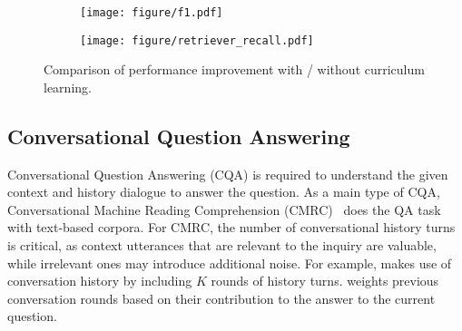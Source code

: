 \begin{figure}[t]
     \centering
     \begin{subfigure}[b]{0.23\textwidth}
         \centering
         \texttt{[image: figure/f1.pdf]}
         \caption{}
         \label{fig:curriculum_f1}
     \end{subfigure}
     \hfill
     \begin{subfigure}[b]{0.23\textwidth}
         \centering
         \texttt{[image: figure/retriever\_recall.pdf]}
         \caption{}
         \label{fig:curriculum_recall}
     \end{subfigure}
     \vspace{-0.15in}
        \caption{Comparison of performance improvement with / without curriculum learning.}
    \vspace{-0.2in}
        \label{fig:curriculum}
\end{figure}

\subsection{Conversational Question Answering} 
Conversational Question Answering (CQA) is required to understand the given context and history dialogue to answer the question.
As a main type of CQA, Conversational Machine Reading Comprehension (CMRC)~\cite{qu2019bert, qu2019attentive, qiu2021reinforced} does the QA task with text-based corpora. 
For CMRC, the number of conversational history turns is critical, as context utterances that are relevant to the inquiry are valuable, while irrelevant ones may introduce additional noise. For example, \cite{qu2019bert, qu2020open} makes use of conversation history by including $K$ rounds of history turns. \cite{qu2019attentive} weights previous conversation rounds based on their contribution to the answer to the current question.

